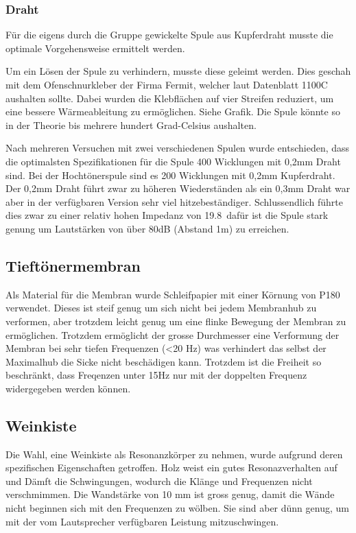 \documentclass[a4paper,11pt]{report}
\begin{document}
\subsubsection*{Draht}
Für die eigens durch die Gruppe gewickelte Spule aus Kupferdraht musste die optimale Vorgehensweise ermittelt werden.

Um ein Lösen der Spule zu verhindern, musste diese geleimt werden. Dies geschah mit dem Ofenschnurkleber der Firma Fermit, welcher laut Datenblatt 1100\textdegree C aushalten sollte. Dabei wurden die Klebflächen auf vier Streifen reduziert, um eine bessere Wärmeableitung zu ermöglichen. Siehe Grafik. Die Spule könnte so in der Theorie bis mehrere hundert Grad-Celsius aushalten.  

Nach mehreren Versuchen mit zwei verschiedenen Spulen wurde entschieden, dass die optimalsten Spezifikationen für die Spule 400 Wicklungen mit 0,2mm Draht sind. Bei der Hochtönerspule sind es 200 Wicklungen mit 0,2mm Kupferdraht. Der 0,2mm Draht führt zwar zu höheren Wiederständen als ein 0,3mm Draht war aber in der verfügbaren Version sehr viel hitzebeständiger. Schlussendlich führte dies zwar zu einer relativ hohen Impedanz von 19.8\Omega\ dafür ist die Spule stark genung um Lautstärken von über 80dB (Abstand 1m) zu erreichen. 

\subsection{Tieftönermembran}
Als Material für die Membran wurde Schleifpapier mit einer Körnung von P180 verwendet. Dieses ist steif genug um sich nicht bei jedem Membranhub zu verformen, aber trotzdem leicht genug um eine flinke Bewegung der Membran zu ermöglichen. Trotzdem ermöglicht der grosse Durchmesser eine Verformung der Membran bei sehr tiefen Frequenzen (<20 Hz) was verhindert das selbst der Maximalhub die Sicke nicht beschädigen kann. Trotzdem ist die Freiheit so beschränkt, dass Freqenzen unter 15Hz nur mit der doppelten Frequenz widergegeben werden können. 

\subsection{Weinkiste}
Die Wahl, eine Weinkiste als Resonanzkörper zu nehmen, wurde aufgrund deren spezifischen Eigenschaften getroffen. Holz weist ein gutes Resonazverhalten auf und Dämft die Schwingungen, wodurch die Klänge und Frequenzen nicht verschmimmen. Die Wandstärke von 10 mm ist gross genug, damit die Wände nicht beginnen sich mit den Frequenzen zu wölben. Sie sind aber dünn genug, um mit der vom Lautsprecher verfügbaren Leistung mitzuschwingen. 
\end{document}
